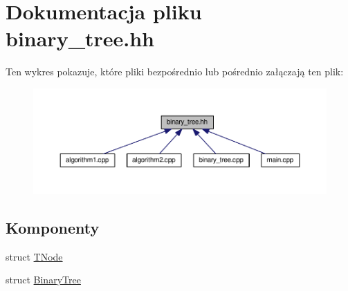 \hypertarget{binary__tree_8hh}{\section{Dokumentacja pliku binary\-\_\-tree.\-hh}
\label{binary__tree_8hh}
}
Ten wykres pokazuje, które pliki bezpośrednio lub pośrednio załączają ten plik\-:\nopagebreak
\begin{figure}[H]
\begin{center}
\leavevmode
\includegraphics[width=350pt]{binary__tree_8hh__dep__incl}
\end{center}
\end{figure}
\subsection*{Komponenty}
\begin{DoxyCompactItemize}
\item 
struct \hyperlink{struct_t_node}{T\-Node}
\item 
struct \hyperlink{struct_binary_tree}{Binary\-Tree}
\end{DoxyCompactItemize}
